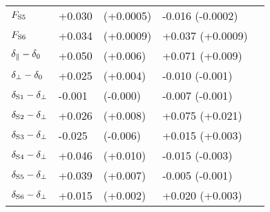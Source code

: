 \begin{table}[htbp]
\begin{tabular}{lllll}
    $\FS[5]$             &  +0.030  &  (+0.0005)                             &  -0.016 (-0.0002)                               \\
    $\FS[6]$             &  +0.034  &  (+0.0009)                             &  +0.037 (+0.0009)                               \\
    \hline
    $\delpar-\delzero$   &  +0.050  &  (+0.006)                              &  +0.071 (+0.009)                                \\
    $\delperp-\delzero$  &  +0.025  &  (+0.004)                              &  -0.010 (-0.001)                                \\
    $\delS[1]-\delperp$  &  -0.001  &  (-0.000)                              &  -0.007 (-0.001)                                \\
    $\delS[2]-\delperp$  &  +0.026  &  (+0.008)                              &  +0.075 (+0.021)                                \\
    $\delS[3]-\delperp$  &  -0.025  &  (-0.006)                              &  +0.015 (+0.003)                                \\
    $\delS[4]-\delperp$  &  +0.046  &  (+0.010)                              &  -0.015 (-0.003)                                \\
    $\delS[5]-\delperp$  &  +0.039  &  (+0.007)                              &  -0.005 (-0.001)                                \\
    $\delS[6]-\delperp$  &  +0.015  &  (+0.002)                              &  +0.020 (+0.003)                                \\
    \hline
  \end{tabular}
\end{table}

